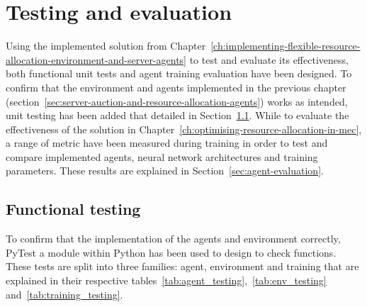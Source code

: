 
\chapter{Testing and evaluation}
\label{ch:testing-and-evaluation}
Using the implemented solution from
Chapter~\ref{ch:implementing-flexible-resource-allocation-environment-and-server-agents} to test and evaluate its
effectiveness, both functional unit tests and agent training evaluation have been designed. To confirm that the
environment and agents implemented in the previous chapter
(section~\ref{sec:server-auction-and-resource-allocation-agents}) works as intended, unit testing has been added
that detailed in Section~\ref{sec:functional-testing}. While to evaluate the effectiveness of the solution
in Chapter~\ref{ch:optimising-resource-allocation-in-mec}, a range of metric have been measured during training in
order to test and compare implemented agents, neural network architectures and training parameters. These results are
explained in Section~\ref{sec:agent-evaluation}.

\section{Functional testing}
\label{sec:functional-testing}
To confirm that the implementation of the agents and environment correctly, PyTest a module within Python has been used
to design to check functions. These tests are split into three families: agent, environment and training that are
explained in their respective tables~\ref{tab:agent_testing},~\ref{tab:env_testing} and~\ref{tab:training_testing}.

